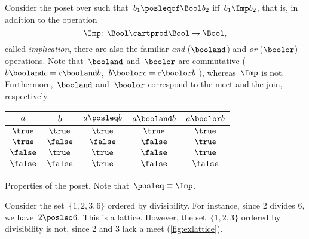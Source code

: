\begin{example}
    Consider the poset over \Bool such that~$b_1 \posleqof\Bool b_2$ iff~$b_1 \Imp b_2$, that is, in addition to the operation
    \begin{equation*}
        \Imp\colon\Bool\cartprod \Bool\to\Bool,
    \end{equation*}
    called \emph{implication}, there are also the familiar \emph{and} ($\booland$) and \emph{or} ($\boolor$) operations.
    Note that~$\booland$ and~$\boolor$ are commutative ($b\booland c = c\booland b$,~$b\boolor c = c\boolor b$ ), whereas~$\Imp$ is not.
    Furthermore,~$\booland$ and~$\boolor$ correspond to the meet and the join, respectively.

    \begin{margintable}
        \centering
        \begin{tabular}{cc|ccc}
            $a$      & $b$      & $a \posleq  b$ & $a \booland b$ & $a \boolor b$ \\ \hline
            $\true$  & $\true$  & $\true$        & $\true$        & $\true$ \\
            $\true$  & $\false$ & $\false$       & $\false$       & $\true$ \\
            $\false$ & $\true$  & $\true$        & $\false$       & $\true$ \\
            $\false$ & $\false$ & $\true$        & $\false$       & $\false$
        \end{tabular}
        \caption{Properties of the \Bool poset.
            Note that~$\posleq \equiv \Imp$.
        }
        \label{tab:boolposet}
    \end{margintable}
\end{example}

\begin{example}
    Consider the set~$\{1,2,3,6\}$ ordered by divisibility.
    For instance, since 2 divides 6, we have~$2\posleq 6$.
    This is a lattice.
    However, the set~$\{1,2,3\}$ ordered by divisibility is not, since 2 and 3 lack a meet (\cref{fig:exlattice}).
\end{example}

